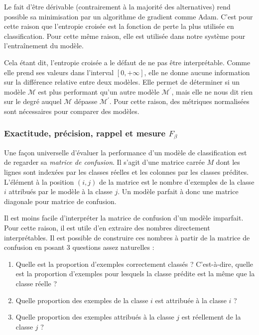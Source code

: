 Le fait d'être dérivable (contrairement à la majorité des alternatives)
rend possible sa minimisation par un algorithme de gradient comme Adam.
C'est pour cette raison que l'entropie croisée est la fonction de perte la plus utilisée en classification.
Pour cette même raison, elle est utilisée dans notre système pour l'entraînement du modèle.

Cela étant dit, l'entropie croisée a le défaut de ne pas être interprétable.
Comme elle prend ses valeurs dans l'interval \([0, +\infty]\), 
elle ne donne aucune information sur la différence relative entre deux modèles.
Elle permet de déterminer si un modèle \(\mathcal{M}\) est plus performant qu'un autre modèle \(\mathcal{M}^\prime\),
mais elle ne nous dit rien sur le degré auquel \(\mathcal{M}\) dépasse \(\mathcal{M}^\prime\).
Pour cette raison, des métriques normalisées sont nécessaires pour comparer des modèles.

\subsubsection{Exactitude, précision, rappel et mesure \(F_\beta\)}

Une façon universelle d'évaluer la performance d'un modèle de classification 
est de regarder sa \emph{matrice de confusion}.
Il s'agit d'une matrice carrée \(M\) 
dont les lignes sont indexées par les classes réelles et les colonnes par les classes prédites.
L'élément à la position \((i, j)\) de la matrice 
est le nombre d'exemples de la classe \(i\) attribués par le modèle à la classe \(j\).
Un modèle parfait à donc une matrice diagonale pour matrice de confusion.

Il est moins facile d'interpréter la matrice de confusion d'un modèle imparfait.
Pour cette raison, il est utile d'en extraire des nombres directement interprétables.
Il est possible de construire ces nombres à partir de la matrice de confusion 
en posant 3 questions assez naturelles :
\begin{enumerate}[label=(\arabic*)]
    \item Quelle est la proportion d'exemples correctement classés ? 
    C'est-à-dire, quelle est la proportion d'exemples pour lesquels 
    la classe prédite est la même que la classe réelle ?
    \item Quelle proportion des exemples de la classe \(i\) est attribuée à la classe \(i\) ?
    \item Quelle proportion des exemples attribués à la classe \(j\) est réellement de la classe \(j\) ?
\end{enumerate}

